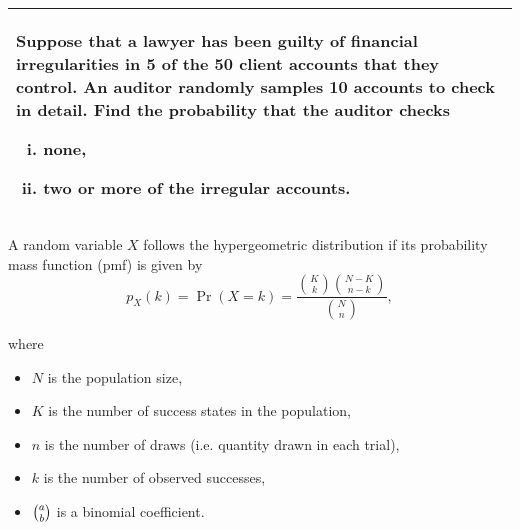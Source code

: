 \documentclass[a4paper,12pt]{article}
\begin{document}
\large
\begin{table}[ht!]
     \centering
     \begin{tabular}{|p{15cm}|}
     \hline        \large
\noindent Suppose that a lawyer has been guilty of financial irregularities in 5 of the 50 client accounts that they control.  An auditor randomly samples 10 accounts to check in detail.  Find the probability that the auditor checks  
\begin{enumerate}[(i)]
\item none, 
\item two or more of the irregular accounts. 
\end{enumerate}
 \\ \hline
      \end{tabular}
    \end{table}
    
  
\begin{framed}
\large
\noindent A random variable 
$ {\displaystyle X} $
 follows the hypergeometric distribution if its probability mass function (pmf) is given by
\[ {\displaystyle p_{X}(k)=\Pr(X=k)={\frac {{\binom {K}{k}}{\binom {N-K}{n-k}}}{\binom {N}{n}}},} \]

where 
\begin{itemize}
\item ${\displaystyle N}$ 
 is the population size,
\item ${\displaystyle K}$ 
 is the number of success states in the population,
\item ${\displaystyle n}$ 
 is the number of draws (i.e. quantity drawn in each trial),
\item ${\displaystyle k}$ 
 is the number of observed successes,
\item ${\textstyle \textstyle {a \choose b}}$ 
 is a binomial coefficient.
\end{itemize}

\end{framed}

\newpage
\end{document}
